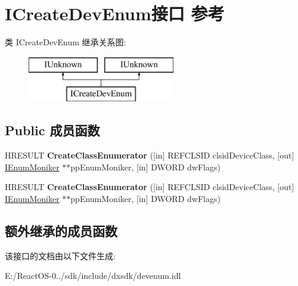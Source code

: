 \hypertarget{interface_i_create_dev_enum}{}\section{I\+Create\+Dev\+Enum接口 参考}
\label{interface_i_create_dev_enum}
类 I\+Create\+Dev\+Enum 继承关系图\+:\begin{figure}[H]
\begin{center}
\leavevmode
\includegraphics[height=2.000000cm]{interface_i_create_dev_enum}
\end{center}
\end{figure}
\subsection*{Public 成员函数}
\begin{DoxyCompactItemize}
\item 
\mbox{\label{interface_i_create_dev_enum_a46c61fb3731e622544b9cb10694b0871}} 
H\+R\+E\+S\+U\+LT {\bfseries Create\+Class\+Enumerator} (\mbox{[}in\mbox{]} R\+E\+F\+C\+L\+S\+ID clsid\+Device\+Class, \mbox{[}out\mbox{]} \hyperlink{interface_i_enum_moniker}{I\+Enum\+Moniker} $\ast$$\ast$pp\+Enum\+Moniker, \mbox{[}in\mbox{]} D\+W\+O\+RD dw\+Flags)
\item 
\mbox{\label{interface_i_create_dev_enum_a46c61fb3731e622544b9cb10694b0871}} 
H\+R\+E\+S\+U\+LT {\bfseries Create\+Class\+Enumerator} (\mbox{[}in\mbox{]} R\+E\+F\+C\+L\+S\+ID clsid\+Device\+Class, \mbox{[}out\mbox{]} \hyperlink{interface_i_enum_moniker}{I\+Enum\+Moniker} $\ast$$\ast$pp\+Enum\+Moniker, \mbox{[}in\mbox{]} D\+W\+O\+RD dw\+Flags)
\end{DoxyCompactItemize}
\subsection*{额外继承的成员函数}


该接口的文档由以下文件生成\+:\begin{DoxyCompactItemize}
\item 
E\+:/\+React\+O\+S-\/0../sdk/include/dxsdk/devenum.\+idl\end{DoxyCompactItemize}

